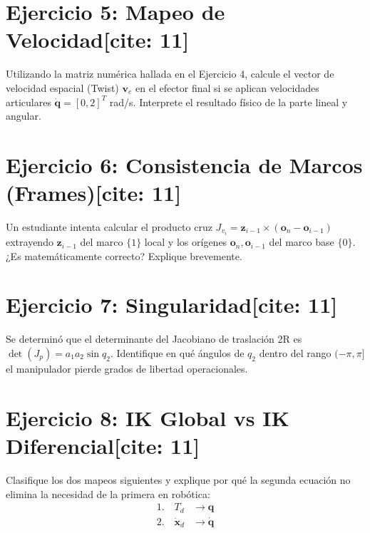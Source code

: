 \documentclass[11pt, a4paper]{article}
\begin{document}
\section*{Ejercicio 5: Mapeo de Velocidad[cite: 11]}
Utilizando la matriz numérica hallada en el Ejercicio 4, calcule el vector de velocidad espacial (Twist) $\mathbf{v}_e$ en el efector final si se aplican velocidades articulares $\dot{\mathbf{q}} = [0, 2]^T$ rad/s. Interprete el resultado físico de la parte lineal y angular.
\vspace{4cm}

\section*{Ejercicio 6: Consistencia de Marcos (Frames)[cite: 11]}
Un estudiante intenta calcular el producto cruz $J_{v_i} = \mathbf{z}_{i-1} \times (\mathbf{o}_n - \mathbf{o}_{i-1})$ extrayendo $\mathbf{z}_{i-1}$ del marco $\{1\}$ local y los orígenes $\mathbf{o}_n, \mathbf{o}_{i-1}$ del marco base $\{0\}$. ¿Es matemáticamente correcto? Explique brevemente.
\vspace{2cm}

\section*{Ejercicio 7: Singularidad[cite: 11]}
Se determinó que el determinante del Jacobiano de traslación 2R es $\det(J_p) = a_1 a_2 \sin q_2$.
Identifique en qué ángulos de $q_2$ dentro del rango $(-\pi, \pi]$ el manipulador pierde grados de libertad operacionales.
\vspace{2cm}

\section*{Ejercicio 8: IK Global vs IK Diferencial[cite: 11]}
Clasifique los dos mapeos siguientes y explique por qué la segunda ecuación no elimina la necesidad de la primera en robótica:
\begin{align*}
    1. \quad T_d &\longrightarrow \mathbf{q} \\
    2. \quad \dot{\mathbf{x}}_d &\longrightarrow \dot{\mathbf{q}}
\end{align*}
\vspace{3cm}
\end{document}
